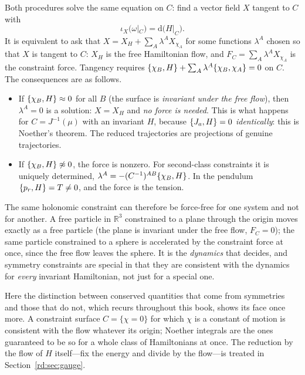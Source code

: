 Both procedures solve the same equation on $C$: find a vector field $X$ tangent to $C$ with
\begin{equation}\label{rd:sameeq}
\iota_X\big(\omega|_C\big)=\mathrm d\big(H|_C\big).
\end{equation}
It is equivalent to ask that $X=X_H+\sum_A\lambda^AX_{\chi_A}$ for some functions $\lambda^A$ chosen so that $X$ is tangent to $C$: $X_H$ is the free Hamiltonian flow, and $F_C=\sum_A\lambda^AX_{\chi_A}$ is the constraint force. Tangency requires $\{\chi_B,H\}+\sum_A\lambda^A\{\chi_B,\chi_A\}=0$ on $C$. The consequences are as follows.

\begin{itemize}
\item If $\{\chi_B,H\}\mathrel{\approx}0$ for all $B$ (the surface is \emph{invariant under the free flow}), then $\lambda^A=0$ is a solution: $X=X_H$ and \emph{no force is needed}. This is what happens for $C=J^{-1}(\mu)$ with an invariant $H$, because $\{J_a,H\}=0$ \emph{identically}: this is Noether's theorem. The reduced trajectories are projections of genuine trajectories.
\item If $\{\chi_B,H\}\not\approx0$, the force is nonzero. For second-class constraints it is uniquely determined, $\lambda^A=-(C^{-1})^{AB}\{\chi_B,H\}$. In the pendulum $\{p_r,H\}=T\neq0$, and the force is the tension.
\end{itemize}

The same holonomic constraint can therefore be force-free for one system and not for another. A free particle in $\mathbb R^3$ constrained to a plane through the origin moves exactly as a free particle (the plane is invariant under the free flow, $F_C=0$); the same particle constrained to a sphere is accelerated by the constraint force at once, since the free flow leaves the sphere. It is the \emph{dynamics} that decides, and symmetry constraints are special in that they are consistent with the dynamics for \emph{every} invariant Hamiltonian, not just for a special one.

Here the distinction between conserved quantities that come from symmetries and those that do not, which recurs throughout this book, shows its face once more. A constraint surface $C=\{\chi=0\}$ for which $\chi$ is a constant of motion is consistent with the flow whatever its origin; Noether integrals are the ones guaranteed to be so for a whole class of Hamiltonians at once. The reduction by the flow of $H$ itself---fix the energy and divide by the flow---is treated in Section~\ref{rd:sec:gauge}.

